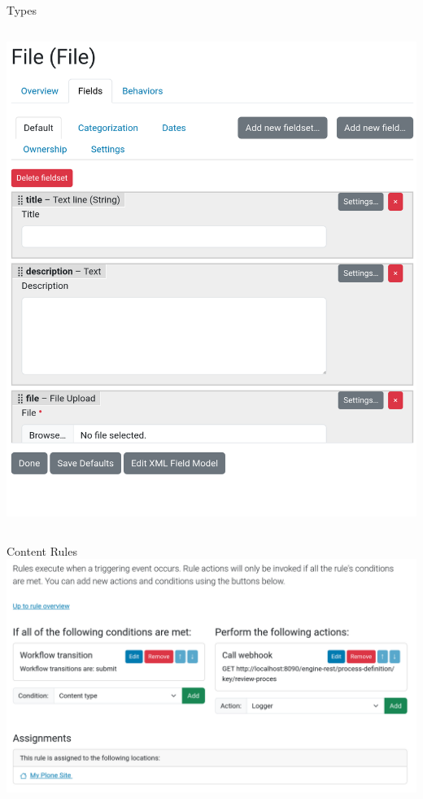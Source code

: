 \documentclass[12pt,aspectratio=169]{beamer}
\begin{document}
\begin{frame}{Types}
\begin{columns}
\begin{column}{0.35\textwidth}
      \includegraphics[width=0.95\columnwidth]{images/dexterity-02.png}
    \end{column}
  \end{columns}
\end{frame}

\begin{frame}{Content Rules}
  \includegraphics[width=0.95\columnwidth]{images/content-rules.png}
\end{frame}

\end{document}
